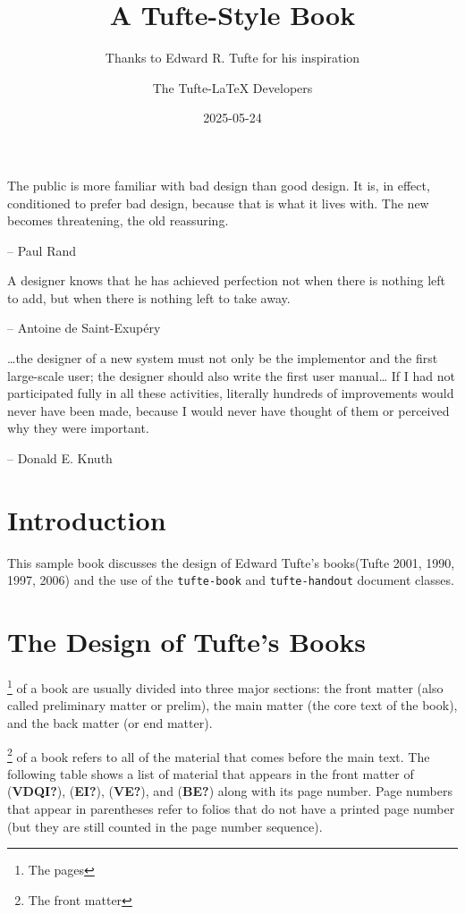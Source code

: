\documentclass[
  twoside,
  symmetric]{tufte-book}
\title{A Tufte-Style Book}
\subtitle{Thanks to Edward R. Tufte for his inspiration}
\author{The Tufte-LaTeX Developers}
\date{2025-05-24}
\begin{document}
\frontmatter
\maketitle


\mainmatter
The public is more familiar with bad design than good design. It is, in
effect, conditioned to prefer bad design, because that is what it lives
with. The new becomes threatening, the old reassuring.

-- Paul Rand

A designer knows that he has achieved perfection not when there is
nothing left to add, but when there is nothing left to take away.

-- Antoine de Saint-Exupéry

\ldots the designer of a new system must not only be the implementor and
the first large-scale user; the designer should also write the first
user manual\ldots{} If I had not participated fully in all these
activities, literally hundreds of improvements would never have been
made, because I would never have thought of them or perceived why they
were important.

-- Donald E. Knuth

\chapter*{Introduction}\label{introduction}

This sample book discusses the design of Edward Tufte's books(Tufte
2001, 1990, 1997, 2006) and the use of the \texttt{tufte-book} and
\texttt{tufte-handout} document classes.

\chapter{The Design of Tufte's Books}\label{ch:tufte-design}

\footnote{The pages} of a book are usually divided into three major
sections: the front matter (also called preliminary matter or prelim),
the main matter (the core text of the book), and the back matter (or end
matter).

\footnote{The front matter} of a book refers to all of the material that
comes before the main text. The following table shows a list of material
that appears in the front matter of (\textbf{VDQI?}), (\textbf{EI?}),
(\textbf{VE?}), and (\textbf{BE?}) along with its page number. Page
numbers that appear in parentheses refer to folios that do not have a
printed page number (but they are still counted in the page number
sequence).
\end{document}

